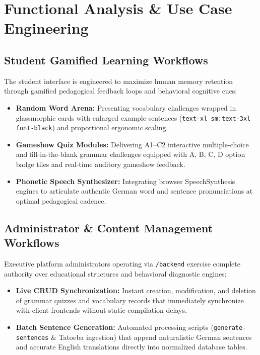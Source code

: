 \documentclass[12pt,a4paper]{article}
\begin{document}
\section{Functional Analysis \& Use Case Engineering}

\subsection{Student Gamified Learning Workflows}
The student interface is engineered to maximize human memory retention through gamified pedagogical feedback loops and behavioral cognitive cues:
\begin{itemize}
    \item \textbf{Random Word Arena:} Presenting vocabulary challenges wrapped in glassmorphic cards with enlarged example sentences (\texttt{text-xl sm:text-3xl font-black}) and proportional ergonomic scaling.
    \item \textbf{Gameshow Quiz Modules:} Delivering A1--C2 interactive multiple-choice and fill-in-the-blank grammar challenges equipped with A, B, C, D option badge tiles and real-time auditory gameshow feedback.
    \item \textbf{Phonetic Speech Synthesizer:} Integrating browser SpeechSynthesis engines to articulate authentic German word and sentence pronunciations at optimal pedagogical cadence.
\end{itemize}

\subsection{Administrator \& Content Management Workflows}
Executive platform administrators operating via \texttt{/backend} exercise complete authority over educational structures and behavioral diagnostic engines:
\begin{itemize}
    \item \textbf{Live CRUD Synchronization:} Instant creation, modification, and deletion of grammar quizzes and vocabulary records that immediately synchronize with client frontends without static compilation delays.
    \item \textbf{Batch Sentence Generation:} Automated processing scripts (\texttt{generate-sentences} \& Tatoeba ingestion) that append naturalistic German sentences and accurate English translations directly into normalized database tables.
\end{itemize}
\end{document}

